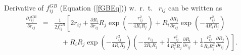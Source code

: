 \documentclass[12pt]{article}
\begin{document}
Derivative of $f_{ij}^{GB}$ (Equation (\ref{fGBEq})) w.~r.~t.~ $r_{ij}$ can be written as
\begin{eqnarray}
\label{eq:fijGBderv1}
\frac{\partial f_{ij}^{GB}}{\partial r_{ij}} & = & \frac{1}{2f_{ij}^{GB}}\left[2r_{ij} + \frac{\partial R_{i}}{\partial r_{ij}}R_{j}\exp\left(-\frac{r_{ij}^{2}}{4R_{i}R_{j}}\right)
 + R_{i} \frac{\partial R_{j}}{\partial r_{ij}}\exp\left(-\frac{r_{ij}^{2}}{4R_{i}R_{j}}\right) \right. \nonumber\\
&& \left. \quad + R_{i}R_{j}\exp\left(-\frac{r_{ij}^{2}}{4R_{i}R_{j}}\right)\left( -\frac{r_{ij}}{2R_{i}R_{j}} + \frac{1}{4}\frac{r_{ij}^{2}}{R_{i}^{2}R_{j}}\frac{\partial R_{i}}{\partial r_{ij}} + \frac{1}{4}\frac{r_{ij}^{2}}{R_{i}R_{j}^{2}}\frac{\partial R_{j}}{\partial r_{ij}}\right)\right].
\end{eqnarray}
\end{document}
